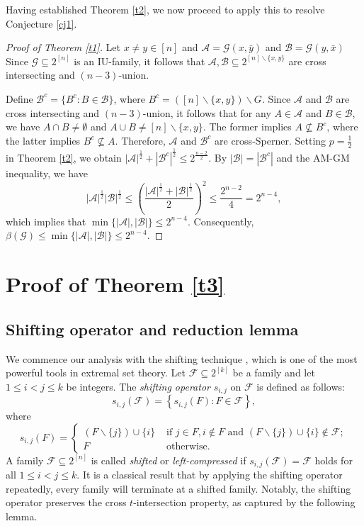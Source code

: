 \documentclass[11pt]{article}
\begin{document}
Having established Theorem \ref{t2}, we now proceed to apply this to resolve Conjecture \ref{cj1}.

\begin{proof}[Proof of Theorem \ref{t1}]
Let $x\neq y \in [n] $ and $\mathcal{A}= \mathcal{G}(x,\bar{y})$ and $\mathcal{B}= \mathcal{G}(y,\bar{x})$
Since $\mathcal{G}\subseteq 2^{[n]}$ is an IU-family, it follows that $\mathcal{A}, \mathcal{B} \subseteq 2^{[n]\backslash \{x,y\}}$ are cross intersecting and $(n-3)$-union.

Define $\mathcal{B}^c=\{B^c: B\in \mathcal{B}\}$, where $B^c=([n]\backslash\{x,y\}) \backslash G$. Since $\mathcal{A}$ and $ \mathcal{B} $ are cross intersecting and $(n-3)$-union, it follows that for any $A\in \mathcal{A}$ and  $B\in \mathcal{B}$, we have $A\cap B\neq \emptyset$ and $A\cup B\neq [n]\backslash\{x,y\}$. The former implies $A\nsubseteq B^c$, where the latter implies $B^c\nsubseteq A$. Therefore, $\mathcal{A}$ and $\mathcal{B}^c$ are cross-Sperner. Setting $p=\frac{1}{2}$ in Theorem \ref{t2}, we obtain $
|\mathcal{A}|^{\frac{1}{2}}+|\mathcal{B}^c|^{\frac{1}{2}}\leq 2^{\frac{n-2}{2}}
$. By $|\mathcal{B}|=|\mathcal{B}^c|$ and the AM-GM inequality,  we have
$$
|\mathcal{A}|^{\frac{1}{2}}|\mathcal{B}|^{\frac{1}{2}}\leq\left(\frac{|\mathcal{A}|^{\frac{1}{2}}+|\mathcal{B}|^{\frac{1}{2}}}{2}\right)^2\leq \frac{2^{n-2}}{4}=2^{n-4},
$$
which implies that $\min\{
|\mathcal{A}|,|\mathcal{B}|\}\leq 2^{n-4}.
$
Consequently,
$
\beta(\mathcal{G})\leq\min\{
|\mathcal{A}|,|\mathcal{B}|\}\leq 2^{n-4}.
$
\end{proof}



\section{Proof of Theorem \ref{t3}}\label{se3}
\subsection{Shifting operator and reduction lemma}
We commence our analysis  with the shifting technique \cite{E61}, which is one of the most powerful tools in extremal set theory.
Let  $\mathcal{F} \subseteq 2^{[k]}$ be a family and let $1 \leq i<j \leq k$ be integers. The \textit{shifting operator} $s_{i, j}$ on $\mathcal{F}$ is defined as follows:
$$s_{i, j}(\mathcal{F})=\left\{s_{i, j}(F): F \in \mathcal{F}\right\},$$
where
$$
s_{i, j}(F)= \begin{cases}
(F \backslash\{j\}) \cup\{i\} & \text { if } j \in F, i \notin F \text { and } (F \backslash\{j\}) \cup\{i\} \notin \mathcal{F}; \\ F & \text { otherwise. }\end{cases}
$$
A family $\mathcal{F} \subseteq 2^{[n]}$ is called \textit{shifted} or \textit{left-compressed} if $s_{i, j}(\mathcal{F})=  \mathcal{F}$ holds for all $1 \leq i<j \leq k$.  
It is a classical result that by applying the shifting operator repeatedly, every family will terminate at a shifted family. Notably, the shifting operator preserves the cross $t$-intersection property, as captured by the following lemma.
\end{document}
